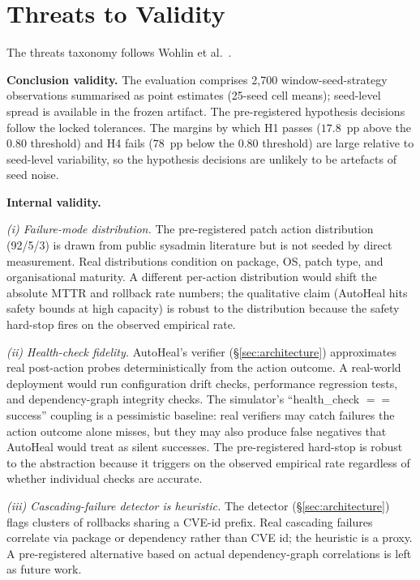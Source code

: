 \section{Threats to Validity}
\label{sec:threats}

The threats taxonomy follows Wohlin et al.~\cite{wohlin2012experimentation}.

\textbf{Conclusion validity.} The evaluation comprises 2{,}700
window-seed-strategy observations summarised as point estimates
(25-seed cell means); seed-level spread is available in the frozen
artifact. The pre-registered hypothesis
decisions follow the locked tolerances. The margins by which H1
passes ($17.8$~pp above the $0.80$ threshold) and H4 fails
($78$~pp below the $0.80$ threshold) are large relative to
seed-level variability, so the hypothesis decisions are unlikely
to be artefacts of seed noise.

\textbf{Internal validity.}

\textit{(i) Failure-mode distribution.} The pre-registered patch
action distribution (92/5/3) is drawn from public sysadmin
literature but is not seeded by direct measurement. Real distributions
condition on package, OS, patch type, and organisational maturity.
A different per-action distribution would shift the absolute MTTR
and rollback rate numbers; the qualitative claim (AutoHeal hits
safety bounds at high capacity) is robust to the distribution
because the safety hard-stop fires on the observed empirical rate.

\textit{(ii) Health-check fidelity.} AutoHeal's verifier
(\S\ref{sec:architecture}) approximates real post-action probes
deterministically from the action outcome. A real-world deployment
would run configuration drift checks, performance regression tests,
and dependency-graph integrity checks. The simulator's
``health\_check $==$ success'' coupling is a pessimistic baseline:
real verifiers may catch failures the action outcome alone misses,
but they may also produce false negatives that AutoHeal would
treat as silent successes. The pre-registered hard-stop is robust
to the abstraction because it triggers on the observed empirical
rate regardless of whether individual checks are accurate.

\textit{(iii) Cascading-failure detector is heuristic.} The
detector (\S\ref{sec:architecture}) flags clusters of rollbacks
sharing a CVE-id prefix. Real cascading failures correlate via
package or dependency rather than CVE id; the heuristic is a
proxy. A pre-registered alternative based on actual
dependency-graph correlations is left as future work.

